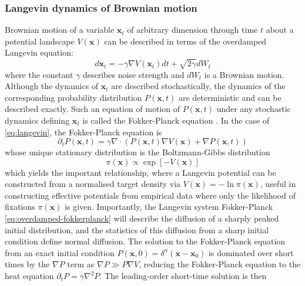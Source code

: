 \subsubsection*{Langevin dynamics of Brownian motion}
Brownian motion of a variable $\textbf{x}_t$ of arbitrary dimension through time $t$ about a potential landscape $V(\textbf{x})$ can be described in terms of the overdamped Langevin equation:
\begin{equation}\label{eq:langevin}
    d\textbf{x}_t = -\gamma \nabla V(\textbf{x}_t) dt + \sqrt{2 \gamma} dW_t 
\end{equation}
where the constant $\gamma$ describes noise strength \cite{smoluchowski1906zur, langevin1908theorie, uhlenbeck1930theory, kramers1940brownian} and $dW_t$ is a Brownian motion. Although the dynamics of $\textbf{x}_t$ are described stochastically, the dynamics of the corresponding probability distribution $P(\textbf{x},t)$ are deterministic and can be described exactly. Such an equation of motion of $P(\textbf{x},t)$ under any stochastic dynamics defining $\textbf{x}_t$ is called the Fokker-Planck equation \cite{boffi_probability_2023, jordan_variational_1998, wang1945theory, kolmogoroff1931analytischen, planck1917ueber, fokker1914mittlere}. In the case of \cref{eq:langevin}, the Fokker-Planck equation is \cite{jordan_variational_1998, boffi_probability_2023, planck1917ueber}
\begin{equation}\label{eq:overdamped-fokkerplanck}
    \partial_t P(\textbf{x},t) = \gamma \nabla \cdot \left( P(\textbf{x},t) \nabla V(\textbf{x}) + \nabla P(\textbf{x},t) \right)
\end{equation}
whose unique stationary distribution is the Boltzmann-Gibbs distribution
\begin{equation}\label{eq:boltzmann-gibbs}
    \pi(\textbf{x}) \propto \exp[-V(\textbf{x})]
\end{equation}
which yields the important relationship, where a 
Langevin potential can be constructed from a normalised target density via $V(\textbf{x}) = -\ln \pi(\textbf{x})$, useful in constructing effective potentials from empirical data where only the likelihood of fixations $\pi(\textbf{x})$ is given. Importantly, the Langevin system Fokker-Planck \cref{eq:overdamped-fokkerplanck} will describe the diffusion of a sharply peaked initial distribution, and the statistics of this diffusion from a sharp initial condition define normal diffusion. The solution to the Fokker-Planck equation from an exact initial condition $P(\textbf{x},0) = \delta^n(\textbf{x}-\textbf{x}_0)$ is dominated over short times by the $\nabla P$ term as $\nabla P \gg P \nabla V$, reducing the Fokker-Planck equation to the heat equation $\partial_t P = \gamma\nabla^2 P$. The leading-order short-time solution is then
